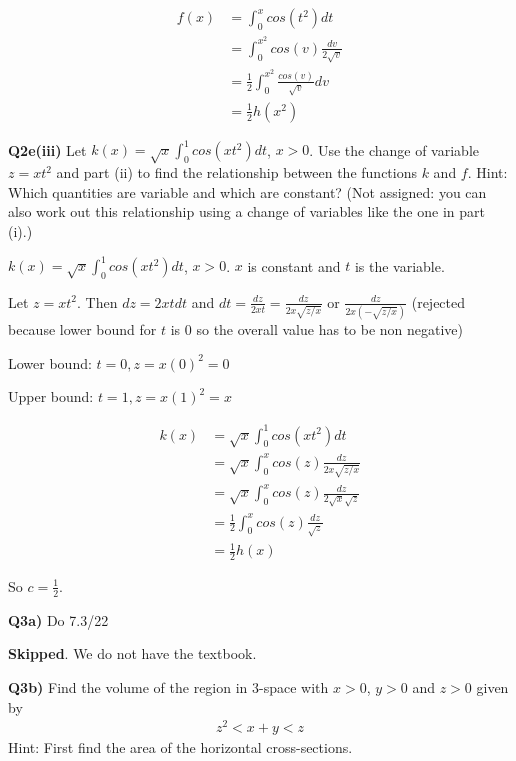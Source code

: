 \documentclass[9pt]{article}
\begin{document}
\begin{align*}
  f(x) &= \int_0^x cos(t^2) dt \\
  &= \int_0^{x^2} cos(v) \frac{dv}{2\sqrt{v}} \\
  &= \frac{1}{2} \int_0^{x^2} \frac{cos(v)}{\sqrt{v}} dv \\
  &= \frac{1}{2} h(x^2)
\end{align*}


\begin{tcolorbox}
  \textbf{Q2e(iii)} Let $k(x) = \sqrt{x} \int_0^1 cos(xt^2)dt$, $x > 0$. Use the change of variable $z = xt^2$ and part (ii) to find the relationship between the functions $k$ and $f$. Hint: Which quantities are variable and which are constant? (Not assigned: you can also work out this relationship using a change of variables like the one in part (i).)
\end{tcolorbox}

$k(x) = \sqrt{x} \int_0^1 cos(xt^2)dt$, $x > 0$. $x$ is constant and $t$ is the variable.

Let $z = xt^2$. Then $dz = 2xt dt$ and $dt = \frac{dz}{2xt} = \frac{dz}{2x\sqrt{z/x}}$ or $\frac{dz}{2x(-\sqrt{z/x})}$ (rejected because lower bound for $t$ is $0$ so the overall value has to be non negative)

Lower bound: $t = 0, z = x(0)^2 = 0$

Upper bound: $t = 1, z = x(1)^2 = x$

\begin{align*}
  k(x) &= \sqrt{x} \int_0^1 cos(xt^2) dt \\
  &= \sqrt{x} \int_0^x cos(z) \frac{dz}{2x\sqrt{z/x}} \\
  &= \sqrt{x} \int_0^x cos(z) \frac{dz}{2\sqrt{x}\sqrt{z}} \\
  &= \frac{1}{2} \int_0^x cos(z) \frac{dz}{\sqrt{z}} \\
  &= \frac{1}{2} h(x)
\end{align*}

So $c = \frac{1}{2}$.


\begin{tcolorbox}
  \textbf{Q3a)} Do 7.3/22
\end{tcolorbox}

\textbf{Skipped}. We do not have the textbook.


\begin{tcolorbox}
  \textbf{Q3b)} Find the volume of the region in 3-space with $x > 0$, $y > 0$ and $z > 0$ given by
  \begin{align*}
    z^2 < x + y < z
  \end{align*}
  Hint: First find the area of the horizontal cross-sections.
\end{tcolorbox}
\end{document}
